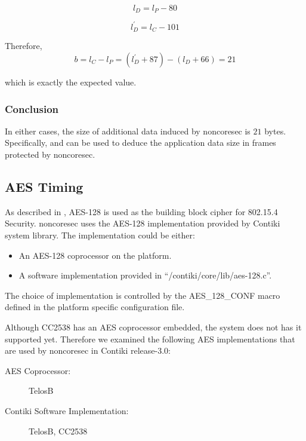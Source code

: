 \begin{equation}
	l_D= l_P - 80
\end{equation}

\begin{equation} \label{Eq: unicast llsec data size}
	l^{\prime}_D = l_{C} - 101 
\end{equation}

Therefore, 
\begin{equation}
	b = l_C - l_P = (l^{\prime}_D + 87) - (l_D + 66) = 21
\end{equation}

which is exactly the expected value.

\subsubsection{Conclusion}

In either cases, the size of additional data induced by noncoresec is $21$ bytes. Specifically,  and  can be used to deduce the application data size in frames protected by noncoresec.

\subsection{AES Timing}

As described in , AES-128 is used as the building block cipher for 802.15.4 Security. noncoresec uses the AES-128 implementation provided by Contiki system library. The implementation could be either:
\begin{itemize}
	\item An AES-128 coprocessor on the platform.
	\item A software implementation provided in ``/contiki/core/lib/aes-128.c''.
\end{itemize}

The choice of implementation is controlled by the AES\_128\_CONF macro defined in the platform specific configuration file.

Although CC2538 has an AES coprocessor embedded,  the system does not has it supported yet. Therefore we examined the following AES implementations that are used by noncoresec in Contiki release-3.0:
\begin{description}
	\item[AES Coprocessor:] TelosB
	\item[Contiki Software Implementation:] TelosB, CC2538
\end{description}

